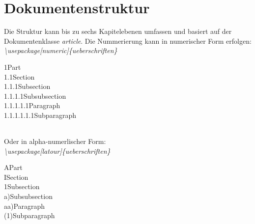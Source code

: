 \documentclass[12pt]{article}
\begin{document}
\section{Dokumentenstruktur}
Die Struktur kann bis zu sechs Kapitelebenen umfassen und basiert auf der Dokumentenklasse \textit{article}. Die Nummerierung kann in numerischer Form erfolgen:\\\textit{\textbackslash usepackage[numeric]\{ueberschriften\}}\\[6pt]
\colorbox{grayBack}{\begin{minipage}{\textwidth}
\vspace{5pt}
\hspace{5pt}1\hspace{15pt}Part\\
\-\hspace{25pt} 1.1\hspace{10pt}Section\\
\-\hspace{50pt} 1.1.1\hspace{5pt}Subsection\\
\-\hspace{80pt} 1.1.1.1\hspace{5pt}Subsubsection\\
\-\hspace{120pt} 1.1.1.1.1\hspace{5pt}Paragraph\\
\-\hspace{170pt} 1.1.1.1.1.1\hspace{5pt}Subparagraph\vspace{5pt}
\end{minipage}
}\\[6pt]
Oder in alpha-numerlischer Form:\\\textit{\textbackslash usepackage[latour]\{ueberschriften\}}\\[6pt]
\colorbox{grayBack}{\begin{minipage}{\textwidth}
\vspace{5pt}
\hspace{5pt}A\hspace{10pt}Part\\
\-\hspace{25pt} I\hspace{10pt}Section\\
\-\hspace{45pt} 1\hspace{10pt}Subsection\\
\-\hspace{65pt} a)\hspace{10pt}Subsubsection\\
\-\hspace{85pt} aa)\hspace{5pt}Paragraph\\
\-\hspace{105pt} (1)\hspace{10pt}Subparagraph\vspace{5pt}
\end{minipage}
}
\end{document}
